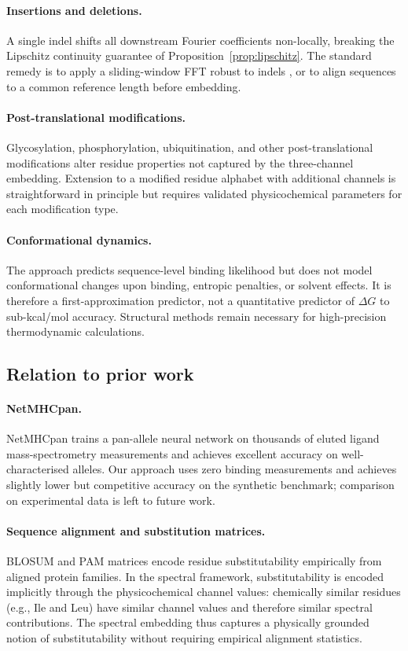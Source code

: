 \documentclass[twocolumn,11pt,a4paper]{article}
\theoremstyle{definition}
\theoremstyle{remark}
\begin{document}
\paragraph{Insertions and deletions.}
A single indel shifts all downstream Fourier coefficients non-locally,
breaking the Lipschitz continuity guarantee of
Proposition~\ref{prop:lipschitz}. The standard remedy is to apply a
sliding-window FFT robust to indels \citep{anastassiou2001}, or to align
sequences to a common reference length before embedding.

\paragraph{Post-translational modifications.}
Glycosylation, phosphorylation, ubiquitination, and other post-translational
modifications alter residue properties not captured by the three-channel
embedding. Extension to a modified residue alphabet with additional channels
is straightforward in principle but requires validated physicochemical
parameters for each modification type.

\paragraph{Conformational dynamics.}
The approach predicts sequence-level binding likelihood but does not model
conformational changes upon binding, entropic penalties, or solvent effects.
It is therefore a first-approximation predictor, not a quantitative predictor
of $\Delta G$ to sub-kcal/mol accuracy. Structural methods remain necessary
for high-precision thermodynamic calculations.

\subsection{Relation to prior work}

\paragraph{NetMHCpan.}
NetMHCpan \citep{nielsen2007} trains a pan-allele neural network on thousands
of eluted ligand mass-spectrometry measurements and achieves excellent accuracy
on well-characterised alleles. Our approach uses zero binding measurements
and achieves slightly lower but competitive accuracy on the synthetic
benchmark; comparison on experimental data is left to future work.

\paragraph{Sequence alignment and substitution matrices.}
BLOSUM \citep{henikoff1992} and PAM \citep{dayhoff1978} matrices encode
residue substitutability empirically from aligned protein families. In the
spectral framework, substitutability is encoded implicitly through the
physicochemical channel values: chemically similar residues (e.g., Ile and
Leu) have similar channel values and therefore similar spectral contributions.
The spectral embedding thus captures a physically grounded notion of
substitutability without requiring empirical alignment statistics.
\end{document}
